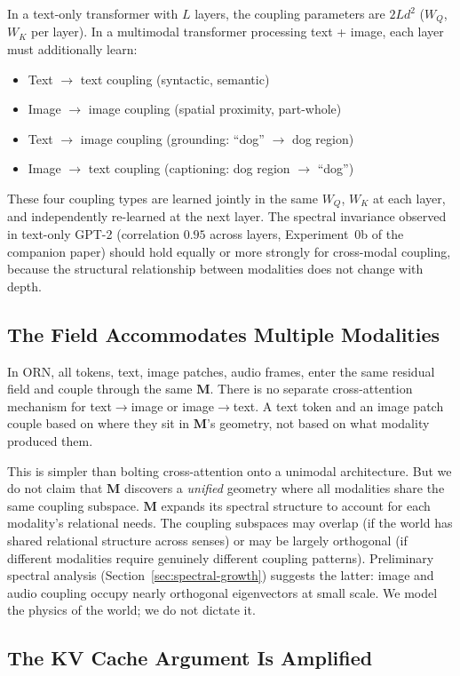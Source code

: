 \documentclass[11pt, a4paper]{article}
\newcommand{\M}{\mathbf{M}}
\theoremstyle{plain}
\theoremstyle{remark}
\begin{document}
In a text-only transformer with $L$ layers, the coupling parameters are $2Ld^2$ ($W_Q$, $W_K$ per layer).
In a multimodal transformer processing text + image, each layer must additionally learn:
\begin{itemize}[nosep]
    \item Text $\to$ text coupling (syntactic, semantic)
    \item Image $\to$ image coupling (spatial proximity, part-whole)
    \item Text $\to$ image coupling (grounding: ``dog'' $\to$ dog region)
    \item Image $\to$ text coupling (captioning: dog region $\to$ ``dog'')
\end{itemize}
These four coupling types are learned jointly in the same $W_Q$, $W_K$ at each layer, and independently re-learned at the next layer.
The spectral invariance observed in text-only GPT-2 (correlation $0.95$ across layers, Experiment~0b of the companion paper) should hold equally or more strongly for cross-modal coupling, because the structural relationship between modalities does not change with depth.

\subsection{The Field Accommodates Multiple Modalities}

In ORN, all tokens, text, image patches, audio frames, enter the same residual field and couple through the same $\M$.
There is no separate cross-attention mechanism for text$\to$image or image$\to$text.
A text token and an image patch couple based on where they sit in $\M$'s geometry, not based on what modality produced them.

This is simpler than bolting cross-attention onto a unimodal architecture.
But we do not claim that $\M$ discovers a \emph{unified} geometry where all modalities share the same coupling subspace.
$\M$ expands its spectral structure to account for each modality's relational needs.
The coupling subspaces may overlap (if the world has shared relational structure across senses) or may be largely orthogonal (if different modalities require genuinely different coupling patterns).
Preliminary spectral analysis (Section~\ref{sec:spectral-growth}) suggests the latter: image and audio coupling occupy nearly orthogonal eigenvectors at small scale.
We model the physics of the world; we do not dictate it.

\subsection{The KV Cache Argument Is Amplified}
\end{document}
